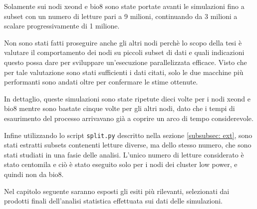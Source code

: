 Solamente sui nodi xeond e bio8 sono state portate avanti le simulazioni fino a subset con un numero di letture pari a 9 milioni, continuando da 3 milioni a scalare progressivamente di 1 milione.

Non sono stati fatti proseguire anche gli altri nodi perchè lo scopo della tesi è valutare il comportamento dei nodi su piccoli subset di dati e quali indicazioni questo possa dare per sviluppare un'esecuzione parallelizzata efficace.
Visto che per tale valutazione sono stati sufficienti i dati citati, solo le due macchine più performanti sono andati oltre per confermare le stime ottenute.

In dettaglio, queste simulazioni sono state ripetute dieci volte per i nodi xeond e bio8 mentre sono bastate cinque volte per gli altri nodi, dato che i tempi di esaurimento del processo arrivavano già a coprire un arco di tempo considerevole.

Infine utilizzando lo script \verb!split.py! descritto nella sezione \ref{subsubsec: ext}, sono stati estratti subsets contenenti letture diverse, ma dello stesso numero, che sono stati studiati in una fasie delle analisi.
L'unico numero di letture considerato è stato centomila e ciò è stato eseguito solo per i nodi dei cluster low power, e quindi non da bio8.

Nel capitolo seguente saranno esposti gli esiti più rilevanti, selezionati dai prodotti finali dell'analisi statistica effettuata sui dati delle simulazioni.  

